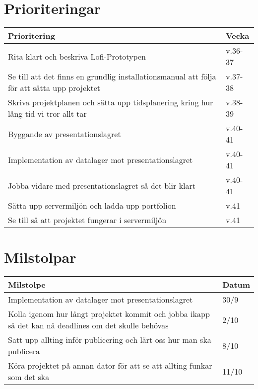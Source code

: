 \documentclass{TDP003mall}
\begin{document}
  \section{Prioriteringar}

  \begin{table}[H]
    \begin{tabular}{|l|l|}
      \hline
      Prioritering & Vecka \\ \hline
      Rita klart och beskriva Lofi-Prototypen & v.36-37 \\ \hline
      Se till att det finns en grundlig installationsmanual att följa för att sätta upp projektet & v.37-38 \\ \hline
      Skriva projektplanen och sätta upp tidsplanering kring hur lång tid vi tror allt tar & v.38-39 \\ \hline
      Byggande av presentationslagret & v.40-41 \\ \hline
      Implementation av datalager mot presentationslagret & v.40-41 \\ \hline
      Jobba vidare med presentationslagret så det blir klart & v.40-41 \\ \hline
      Sätta upp servermiljön och ladda upp portfolion & v.41 \\ \hline
      Se till så att projektet fungerar i servermiljön & v.41 \\ \hline
    \end{tabular}
  \end{table}

\section{Milstolpar}

\begin{table}[H]
  \begin{tabular}{|l|l|}
    \hline
    Milstolpe & Datum \\ \hline
    Implementation av datalager mot presentationslagret & 30/9 \\ \hline
    Kolla igenom hur långt projektet kommit och jobba ikapp så det kan nå deadlines om det skulle behövas & 2/10 \\ \hline
    Satt upp allting inför publicering och lärt oss hur man ska publicera & 8/10 \\ \hline
    Köra projektet på annan dator för att se att allting funkar som det ska & 11/10 \\ \hline
  \end{tabular}
\end{table}
\end{document}
